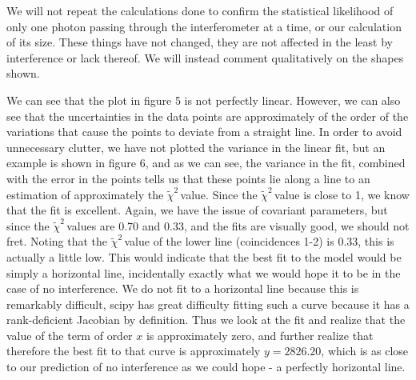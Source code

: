 \documentclass{article}
\newcommand{\redchi}{$\tilde{\chi}^2\,$}
\begin{document}
We will not repeat the calculations done to confirm the statistical likelihood of only one photon passing through the interferometer at a time, or our calculation of its size.  These things have not changed, they are not affected in the least by interference or lack thereof.  We will instead comment qualitatively on the shapes shown.

\hspace{.25cm}

We can see that the plot in figure 5 is not perfectly linear.  However, we can also see that the uncertainties in the data points are approximately of the order of the variations that cause the points to deviate from a straight line.  In order to avoid unnecessary clutter, we have not plotted the variance in the linear fit, but an example is shown in figure 6, and as we can see, the variance in the fit, combined with the error in the points tells us that these points lie along a line to an estimation of approximately the \redchi value.  Since the \redchi value is close to 1, we know that the fit is excellent.  Again, we have the issue of covariant parameters, but since the \redchi values are 0.70 and 0.33, and the fits are visually good, we should not fret.  Noting that the \redchi value of the lower line (coincidences 1-2) is 0.33, this is actually a little low.  This would indicate that the best fit to the model would be simply a horizontal line, incidentally exactly what we would hope it to be in the case of no interference.  We do not fit to a horizontal line because this is remarkably difficult, scipy has great difficulty fitting such a curve because it has a rank-deficient Jacobian by definition.  Thus we look at the fit and realize that the value of the term of order $x$ is approximately zero, and further realize that therefore the best fit to that curve is approximately $y = 2826.20$, which is as close to our prediction of no interference as we could hope - a perfectly horizontal line.
\end{document}
